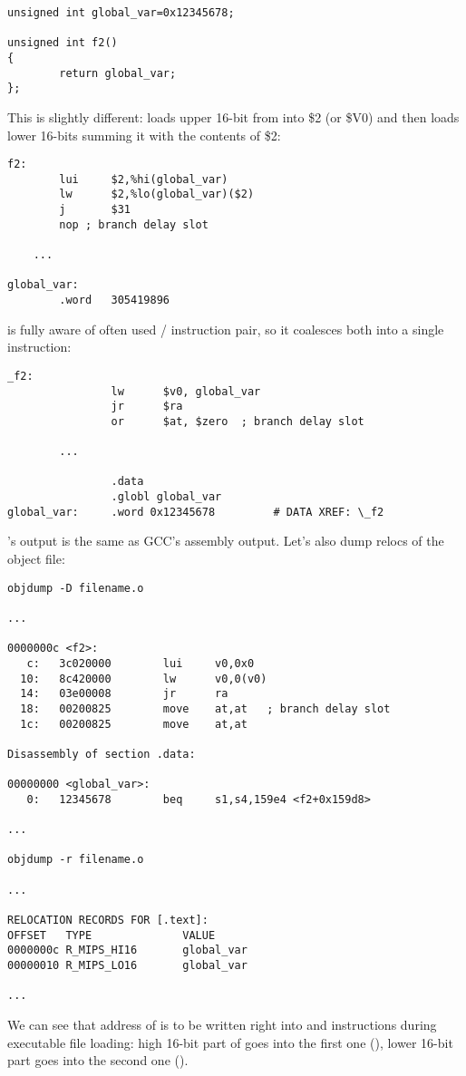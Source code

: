 \begin{lstlisting}[style=customc]
unsigned int global_var=0x12345678;

unsigned int f2()
{
        return global_var;
};
\end{lstlisting}


This is slightly different:  loads upper 16-bit from  into \$2 (or \$V0) and then  loads lower 16-bits summing it with the contents of \$2:

\begin{lstlisting}[caption=GCC 4.4.5 -O3 (\assemblyOutput),style=customasmMIPS]
f2:
        lui     $2,%hi(global_var)
        lw      $2,%lo(global_var)($2)
        j       $31
        nop	; branch delay slot

	...

global_var:
        .word   305419896
\end{lstlisting}

\IDA is fully aware of often used / instruction pair, so it coalesces both into a single  instruction:

\begin{lstlisting}[caption=GCC 4.4.5 -O3 (IDA),style=customasmMIPS]
_f2:
                lw      $v0, global_var
                jr      $ra
                or      $at, $zero	; branch delay slot

		...

                .data
                .globl global_var
global_var:     .word 0x12345678         # DATA XREF: \_f2
\end{lstlisting}

's output is the same as GCC's assembly output.
Let's also dump relocs of the object file:

\begin{lstlisting}[caption=objdump,style=customasmMIPS]
objdump -D filename.o

...

0000000c <f2>:
   c:   3c020000        lui     v0,0x0
  10:   8c420000        lw      v0,0(v0)
  14:   03e00008        jr      ra
  18:   00200825        move    at,at	; branch delay slot
  1c:   00200825        move    at,at

Disassembly of section .data:

00000000 <global_var>:
   0:   12345678        beq     s1,s4,159e4 <f2+0x159d8>

...

objdump -r filename.o

...

RELOCATION RECORDS FOR [.text]:
OFFSET   TYPE              VALUE
0000000c R_MIPS_HI16       global_var
00000010 R_MIPS_LO16       global_var

...

\end{lstlisting}

We can see that address of  is to be written right into  and  instructions during executable file loading:
high 16-bit part of  goes into the first one (), lower 16-bit part goes into the second one ().

